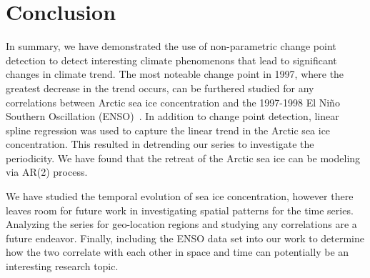 \documentclass[12pt]{article}
\begin{document}
\section{Conclusion}
In summary, we have demonstrated the use of non-parametric change point detection to detect interesting climate phenomenons that lead to significant changes in climate trend. The most noteable change point in 1997, where the greatest decrease in the trend occurs, can be furthered studied for any correlations between Arctic sea ice concentration and the 1997-1998 El Niño Southern Oscillation (ENSO)~\citep{elnino}. In addition to change point detection, linear spline regression was used to capture the linear trend in the Arctic sea ice concentration. This resulted in detrending our series to investigate the periodicity. We have found that the retreat of the Arctic sea ice can be modeling via AR(2) process.

We have studied the temporal evolution of sea ice concentration, however there leaves room for future work in investigating spatial patterns for the time series. Analyzing the series for geo-location regions and studying any correlations are a future endeavor. Finally, including the ENSO data set into our work to determine how the two correlate with each other in space and time can potentially be an interesting research topic.



\end{document}
